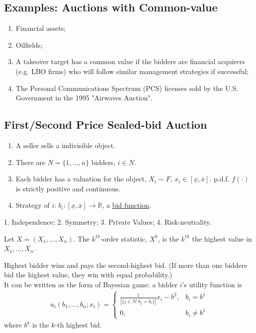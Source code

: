 \documentclass[11pt]{elegantbook}
\begin{document}
\subsection{Examples: Auctions with Common-value}
\begin{enumerate}[(1).]
    \item Financial assets;
    \item Oilfields;
    \item A takeover target has a common value if the bidders are financial acquirers (e.g. LBO firms) who will follow similar management strategies if successful;
    \item The Personal Communications Spectrum (PCS) licenses sold by the U.S. Government in the 1995 "Airwaves Auction".
\end{enumerate}

\subsection{First/Second Price Sealed-bid Auction}
\begin{enumerate}[$\circ$]
    \item A seller sells a indivisible object.
    \item There are $N=\{1,...,n\}$ bidders, $i\in N$.
    \item Each bidder has a valuation for the object, $X_i\sim F$, $x_i\in[\underline{x},\overline{x}]$. p.d.f. $f(\cdot)$ is strictly positive and continuous.
    \item Strategy of $i$: $b_i:[\underline{x},\overline{x}] \rightarrow \mathbb{R}$, a \underline{bid function}.
\end{enumerate}

\begin{assumption}
    1. Independence; 2. Symmetry; 3. Private Values; 4. Risk-neutrality.
\end{assumption}

Let $X=(X_1,...,X_n)$. The $k^{th}$-order statistic, $X^k$, is the $k^{th}$ the highest value in $X_1,...,X_n$.

\begin{definition}
    \normalfont
    Highest bidder wins and pays the second-highest bid. (If more than one bidders bid the highest value, they win with equal probability.)\\
    It can be written as the form of Bayesian game: a bidder $i$'s utility function is
    \begin{equation}
        \begin{aligned}
            u_i(b_1,...,b_n;x_i)=\left\{\begin{matrix}
                \frac{1}{|\{j\in N:b_j=b_i\}|}x_i-b^2,&b_i=b^1\\
                0,&b_i\neq b^1
            \end{matrix}\right.
        \end{aligned}
        \nonumber
    \end{equation}
    where $b^k$ is the $k$-th highest bid.
\end{definition}
\end{document}
